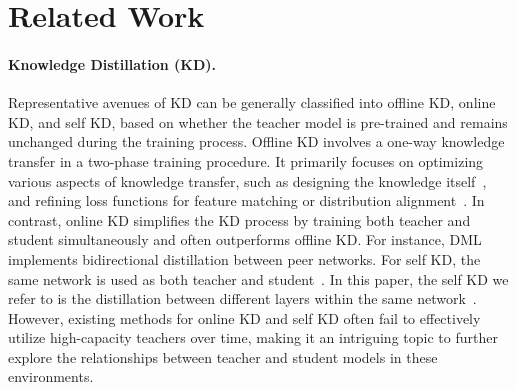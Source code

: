 \section{Related Work}
\label{sec:related}
\paragraph{Knowledge Distillation (KD).}
Representative avenues of KD can be generally classified into offline KD, online KD, and self KD, based on whether the teacher model is pre-trained and remains unchanged during the training process. Offline KD involves a one-way knowledge transfer in a two-phase training procedure. It primarily focuses on optimizing various aspects of knowledge transfer, such as designing the knowledge itself~\citep{hinton2015distilling,adriana2015fitnets}, and refining loss functions for feature matching or distribution alignment~\citep{huang2017like,asif2019ensemble,teacherassistant}.
In contrast, online KD simplifies the KD process by training both teacher and student simultaneously and often outperforms offline KD. For instance, DML~\citep{deepMutual} implements bidirectional distillation between peer networks. %
For self KD, the same network is used as both teacher and student~\citep{self-kd,das2023understanding,mobahi2020self,zhang2020self,yang2019snapshot,lee2019rethinking}.
In this paper, the self KD we refer to is the distillation between different layers within the same network~\citep{self-kd,yan2024orchestrate,zhai2019lifelong}. 
However, existing methods for online KD and self KD often fail to effectively utilize high-capacity teachers over time, making it an intriguing topic to further explore the relationships between teacher and student models in these environments.

